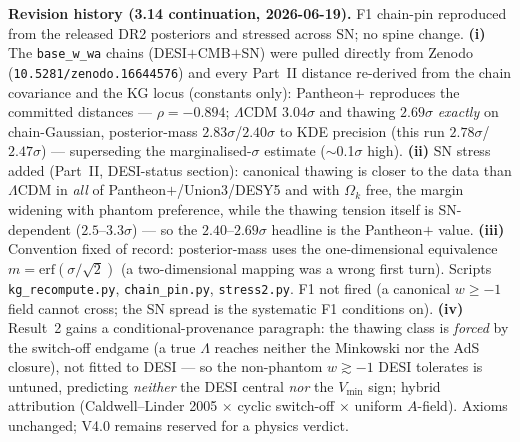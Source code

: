 \documentclass[11pt]{article}
\begin{document}
{\medskip
\noindent\textbf{Revision history (3.14 continuation, 2026-06-19).} F1 chain-pin reproduced from the released DR2 posteriors and stressed across SN; no spine change. \textbf{(i)} The \texttt{base\_w\_wa} chains (DESI$+$CMB$+$SN) were pulled directly from Zenodo (\texttt{10.5281/zenodo.16644576}) and every Part~II distance re-derived from the chain covariance and the KG locus (constants only): Pantheon$+$ reproduces the committed distances --- $\rho=-0.894$; $\Lambda$CDM $3.04\sigma$ and thawing $2.69\sigma$ \emph{exactly} on chain-Gaussian, posterior-mass $2.83\sigma$/$2.40\sigma$ to KDE precision (this run $2.78\sigma$/$2.47\sigma$) --- superseding the marginalised-$\sigma$ estimate ($\sim$0.1$\sigma$ high). \textbf{(ii)} SN stress added (Part~II, DESI-status section): canonical thawing is closer to the data than $\Lambda$CDM in \emph{all} of Pantheon$+$/Union3/DESY5 and with $\Omega_k$ free, the margin widening with phantom preference, while the thawing tension itself is SN-dependent ($2.5$--$3.3\sigma$) --- so the $2.40$--$2.69\sigma$ headline is the Pantheon$+$ value. \textbf{(iii)} Convention fixed of record: posterior-mass uses the one-dimensional equivalence $m=\mathrm{erf}(\sigma/\sqrt2)$ (a two-dimensional mapping was a wrong first turn). Scripts \texttt{kg\_recompute.py}, \texttt{chain\_pin.py}, \texttt{stress2.py}. F1 not fired (a canonical $w\ge-1$ field cannot cross; the SN spread is the systematic F1 conditions on). \textbf{(iv)} Result~2 gains a conditional-provenance paragraph: the thawing class is \emph{forced} by the switch-off endgame (a true $\Lambda$ reaches neither the Minkowski nor the AdS closure), not fitted to DESI --- so the non-phantom $w\gtrsim-1$ DESI tolerates is untuned, predicting \emph{neither} the DESI central \emph{nor} the $V_{\min}$ sign; hybrid attribution (Caldwell--Linder 2005 $\times$ cyclic switch-off $\times$ uniform $A$-field). Axioms unchanged; V4.0 remains reserved for a physics verdict.

}
\end{document}
